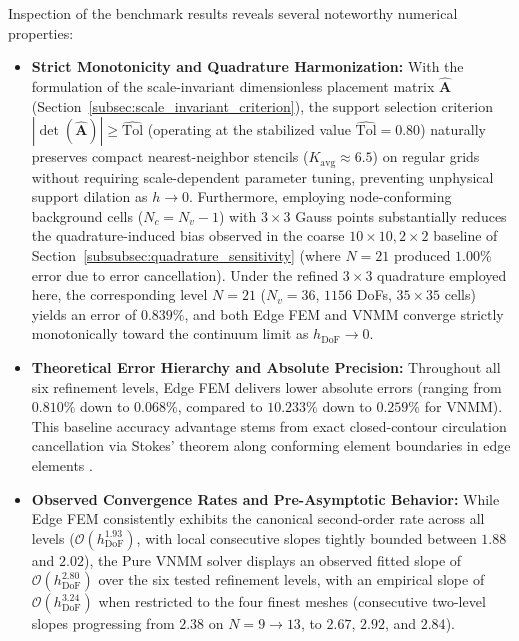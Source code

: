 \documentclass[preprint,12pt]{elsarticle}
\begin{document}
Inspection of the benchmark results reveals several noteworthy numerical properties:
\begin{itemize}
    \item \textbf{Strict Monotonicity and Quadrature Harmonization:} With the formulation of the scale-invariant dimensionless placement matrix $\widehat{\mathbf{A}}$ (Section~\ref{subsec:scale_invariant_criterion}), the support selection criterion $|\det(\widehat{\mathbf{A}})| \ge \widehat{\mathrm{Tol}}$ (operating at the stabilized value $\widehat{\mathrm{Tol}} = 0.80$) naturally preserves compact nearest-neighbor stencils ($K_{\mathrm{avg}} \approx 6.5$) on regular grids without requiring scale-dependent parameter tuning, preventing unphysical support dilation as $h \to 0$. Furthermore, employing node-conforming background cells ($N_c = N_v - 1$) with $3 \times 3$ Gauss points substantially reduces the quadrature-induced bias observed in the coarse $10 \times 10, 2 \times 2$ baseline of Section~\ref{subsubsec:quadrature_sensitivity} (where $N = 21$ produced $1.00\%$ error due to error cancellation). Under the refined $3 \times 3$ quadrature employed here, the corresponding level $N = 21$ ($N_v = 36$, $1156$ DoFs, $35 \times 35$ cells) yields an error of $0.839\%$, and both Edge FEM and VNMM converge strictly monotonically toward the continuum limit as $h_{\mathrm{DoF}} \to 0$.
    \item \textbf{Theoretical Error Hierarchy and Absolute Precision:} Throughout all six refinement levels, Edge FEM delivers lower absolute errors (ranging from $0.810\%$ down to $0.068\%$, compared to $10.233\%$ down to $0.259\%$ for VNMM). This baseline accuracy advantage stems from exact closed-contour circulation cancellation via Stokes' theorem along conforming element boundaries in edge elements \cite{nedelec1980mixed, monk2003finite}.
    \item \textbf{Observed Convergence Rates and Pre-Asymptotic Behavior:} While Edge FEM consistently exhibits the canonical second-order rate across all levels ($\mathcal{O}(h_{\mathrm{DoF}}^{1.93})$, with local consecutive slopes tightly bounded between $1.88$ and $2.02$), the Pure VNMM solver displays an observed fitted slope of $\mathcal{O}(h_{\mathrm{DoF}}^{2.80})$ over the six tested refinement levels, with an empirical slope of $\mathcal{O}(h_{\mathrm{DoF}}^{3.24})$ when restricted to the four finest meshes (consecutive two-level slopes progressing from $2.38$ on $N=9 \to 13$, to $2.67$, $2.92$, and $2.84$). 


\end{itemize}
\end{document}
